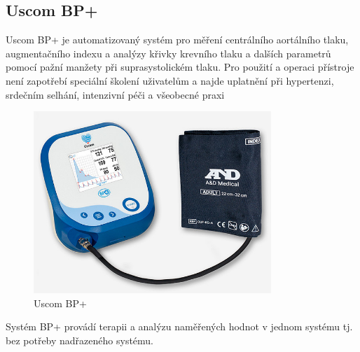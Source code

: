 \subsection{Uscom BP+}
Uscom BP+ je automatizovaný systém pro měření centrálního aortálního tlaku, augmentačního indexu a analýzy křivky krevního tlaku a dalších parametrů pomocí pažní manžety při suprasystolickém tlaku.
Pro použití a operaci přístroje není zapotřebí speciální školení uživatelům a najde uplatnění při hypertenzi, srdečním selhání, intenzivní péči a všeobecné praxi
\cite{cite:Uscom}
\begin{figure}[H]
    \caption{Uscom BP+ \cite{cite:Uscom}}
    \includegraphics[width=0.8\textwidth]{pictures/uscom_bp.jpg}
\end{figure}
Systém BP+ provádí terapii a analýzu naměřených hodnot v jednom systému tj. bez potřeby nadřazeného systému.
\cite{cite:Uscom}
